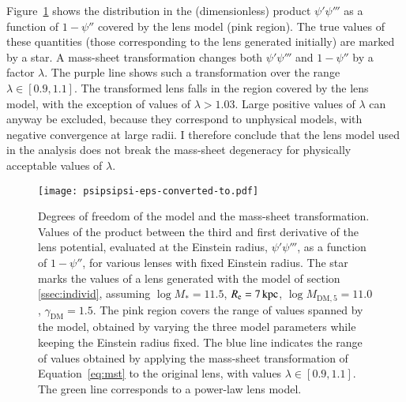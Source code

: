 \documentclass{aa}
\def\mstar{M_*}
\def\mfive{M_{\mathrm{DM},5}}
\def\gammadm{\gamma_{\mathrm{DM}}}
\def\reff{R_{\mathrm{e}}}
\def\Fref#1{Figure~\ref{#1}\xspace}
\def\Eref#1{Equation~\ref{#1}\xspace}
\begin{document}
\Fref{fig:psipsi} shows the distribution in the (dimensionless) product $\psi'\psi'''$ as a function of $1-\psi''$ covered by the lens model (pink region).
The true values of these quantities (those corresponding to the lens generated initially) are marked by a star. 
A mass-sheet transformation changes both $\psi'\psi'''$ and $1 - \psi''$ by a factor $\lambda$. The purple line shows such a transformation over the range $\lambda\in[0.9,1.1]$.
The transformed lens falls in the region covered by the lens model, with the exception of values of $\lambda > 1.03$.
Large positive values of $\lambda$ can anyway be excluded, because they correspond to unphysical models, with negative convergence at large radii.
I therefore conclude that the lens model used in the analysis does not break the mass-sheet degeneracy for physically acceptable values of $\lambda$.
%
\begin{figure}
\texttt{[image: psipsipsi-eps-converted-to.pdf]}
\caption{
Degrees of freedom of the model and the mass-sheet transformation.
Values of the product between the third and first derivative of the lens potential, evaluated at the Einstein radius, $\psi'\psi'''$, as a function of $1-\psi''$, for various lenses with fixed Einstein radius.
The star marks the values of a lens generated with the model of section \ref{ssec:individ}, assuming $\log{\mstar}=11.5$, $\reff=7\,{\rm kpc}$, $\log{\mfive}=11.0$, $\gammadm=1.5$.
The pink region covers the range of values spanned by the model, obtained by varying the three model parameters while keeping the Einstein radius fixed.
The blue line indicates the range of values obtained by applying the mass-sheet transformation of \Eref{eq:mst} to the original lens, with values $\lambda\in[0.9,1.1]$.
The green line corresponds to a power-law lens model.
\label{fig:psipsi}
}
\end{figure}
\end{document}
